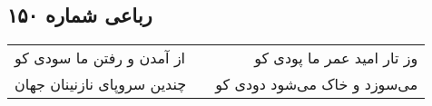 \begin{center}
\section*{رباعی شماره ۱۵۰}
\label{sec:sh150}
\begin{longtable}{l p{0.5cm} r}
از آمدن و رفتن ما سودی کو
&&
وز تار امید عمر ما پودی کو
\\
چندین سروپای نازنینان جهان
&&
می‌سوزد و خاک می‌شود دودی کو
\\
\end{longtable}
\end{center}
